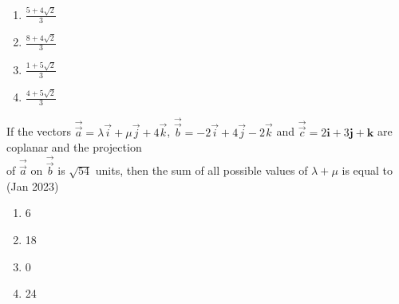 \begin{multicols}{2}
\begin{enumerate}
    \item $\frac{5 + 4\sqrt{2}}{3}$\\
    \item $\frac{8 + 4\sqrt{2}}{3}$
    \item $\frac{1 + 5\sqrt{2}}{3}$\\
    \item $\frac{4 + 5\sqrt{2}}{3}$\\
\end{enumerate}
\end{multicols}

\item If the vectors $\overrightarrow{\vec{a}} = \lambda\vec{i} + \mu\vec{j} + 4\vec{k}$, $\overrightarrow{\vec{b}} = -2\vec{i} + 4\vec{j} -2\vec{k}$ and  $\overrightarrow{\vec{c}} = 2\mathbf{i} + 3\mathbf{j} + \mathbf{k}$ are coplanar and the projection\\ of  $\overrightarrow{\vec{a}}$ on $\overrightarrow{\vec{b}}$ is $\sqrt{54}$ units, then the sum of all possible values of $\lambda + \mu$ is equal to \hfill(Jan 2023)
\begin{multicols}{4}
    \begin{enumerate}
    \item 6
    \item 18
    \item 0 
    \item 24
\end{enumerate}
\end{multicols}
